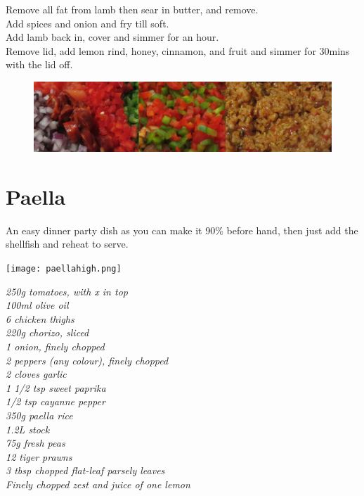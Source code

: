 \documentclass{tufte-book}
\begin{document}
\smallskip
Remove all fat from lamb then sear in butter, and remove.
\\Add spices and onion and fry till soft.
\\Add lamb back in, cover and simmer for an hour.
\\Remove lid, add lemon rind, honey, cinnamon, and fruit and simmer for 30mins with the lid off.

\newpage


\begin{figure}[h]
  \includegraphics[width=\linewidth]{paella.png}
\end{figure}

\section{Paella}

An easy dinner party dish as you can make it 90\% before hand, then just add the shellfish and reheat to serve.

\begin{marginfigure}%
  \texttt{[image: paellahigh.png]}
\end{marginfigure}

\smallskip
\emph{250g tomatoes, with x in top
\\100ml olive oil
\\6 chicken thighs
\\220g chorizo, sliced
\\1 onion, finely chopped
\\2 peppers (any colour), finely chopped
\\2 cloves garlic
\\1 1/2 tsp sweet paprika
\\1/2 tsp cayanne pepper
\\350g paella rice
\\1.2L stock
\\75g fresh peas
\\12 tiger prawns
\\3 tbsp chopped flat-leaf parsely leaves
\\Finely chopped zest and juice of one lemon
}
\end{document}
